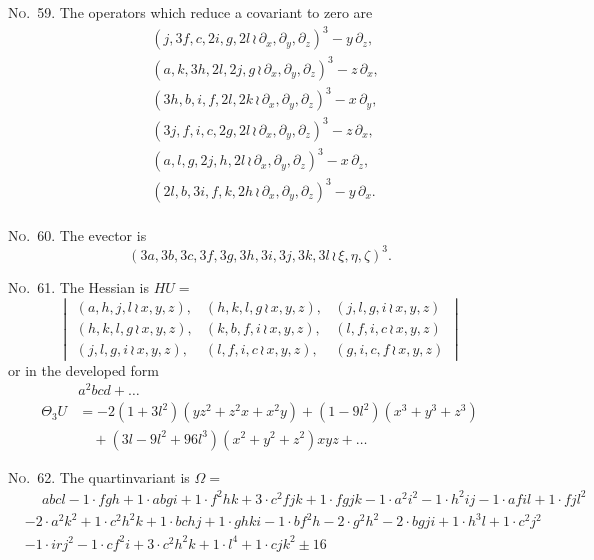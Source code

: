 \documentclass[11pt,a4paper]{book}
\begin{document}
\begin{center}
\noindent\textsc{No.~59.} The operators which reduce a covariant to zero are
\begin{align*}
&(j, 3f, c, 2i, g, 2l \, \wr\, \partial_x, \partial_y, \partial_z)^3 - y\,\partial_z,\\
&(a, k, 3h, 2l, 2j, g \, \wr\, \partial_x, \partial_y, \partial_z)^3 - z\,\partial_x,\\
&(3h, b, i, f, 2l, 2k \, \wr\, \partial_x, \partial_y, \partial_z)^3 - x\,\partial_y,\\
&(3j, f, i, c, 2g, 2l \, \wr\, \partial_x, \partial_y, \partial_z)^3 - z\,\partial_x,\\
&(a, l, g, 2j, h, 2l \, \wr\, \partial_x, \partial_y, \partial_z)^3 - x\,\partial_z,\\
&(2l, b, 3i, f, k, 2h \, \wr\, \partial_x, \partial_y, \partial_z)^3 - y\,\partial_x.\\
\end{align*}

\noindent\textsc{No.~60.} The evector is
\[(3a, 3b, 3c, 3f, 3g, 3h, 3i, 3j, 3k, 3l \, \wr\, \xi, \eta, \zeta)^3.\]

\noindent\textsc{No.~61.} The Hessian is $HU =$
\[
\begin{vmatrix}
(a, h, j, l \, \wr\, x, y, z), & (h, k, l, g \, \wr\, x, y, z), & (j, l, g, i \, \wr\, x, y, z) \\
(h, k, l, g \, \wr\, x, y, z), & (k, b, f, i \, \wr\, x, y, z), & (l, f, i, c \, \wr\, x, y, z) \\
(j, l, g, i \, \wr\, x, y, z), & (l, f, i, c \, \wr\, x, y, z), & (g, i, c, f \, \wr\, x, y, z)
\end{vmatrix}
\]
or in the developed form
\begin{align*}
&a^2bcd + \ldots \\
\Theta_3 U &= -2(1 + 3l^2)(yz^2 + z^2x + x^2y) + (1 - 9l^2)(x^3 + y^3 + z^3)\\
&\quad + (3l - 9l^2 + 96l^3)(x^2 + y^2 + z^2)xyz + \ldots
\end{align*}

\clearpage
\noindent\textsc{No.~62.} The quartinvariant is $\Omega =$
\begin{align*}
&\phantom{+} abcl - 1\cdot fgh + 1\cdot abgi + 1\cdot f^2hk + 3\cdot c^2fjk + 1\cdot fgjk - 1\cdot a^2i^2 - 1\cdot h^2ij - 1\cdot afil + 1\cdot fjl^2\\
& - 2\cdot a^2k^2 + 1\cdot c^2h^2k + 1\cdot bchj + 1\cdot ghki - 1\cdot bf^2h - 2\cdot g^2h^2 - 2\cdot bgji + 1\cdot h^3l + 1\cdot c^2j^2\\
& - 1\cdot irj^2 - 1\cdot cf^2i + 3\cdot c^2h^2k + 1\cdot l^4 + 1\cdot cjk^2 \pm 16
\end{align*}


\end{center}
\end{document}
